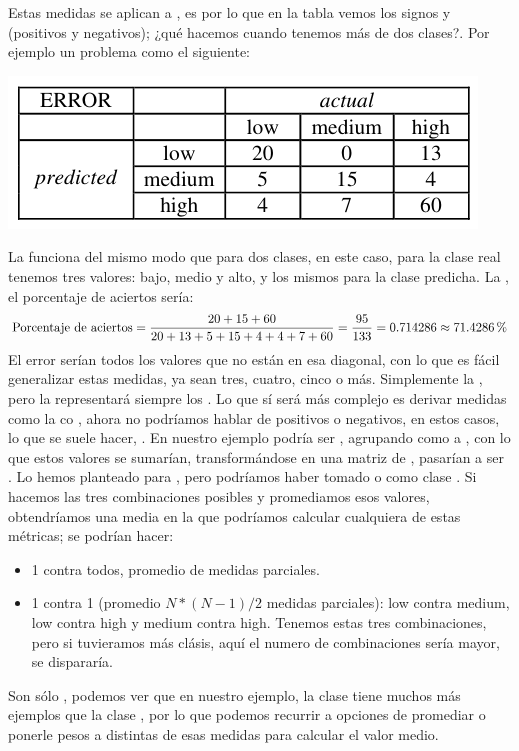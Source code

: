 Estas medidas se aplican a , es por lo que en la tabla vemos los signos \ti{+} y \ti{-} (positivos y negativos); ¿qué hacemos cuando tenemos más de dos clases?. Por ejemplo un problema como el siguiente:
\begin{center}
    \includegraphics[scale=.75]{images/mod02-13.png}
\end{center}
La  funciona del mismo modo que para dos clases, en este caso, para la clase real tenemos tres valores: bajo, medio y alto, y los mismos para la clase predicha. La , el porcentaje de aciertos sería:
\[
\text{Porcentaje de aciertos} = \frac{20+15+60}{20+13+5+15+4+4+7+60} = \frac{95}{133} =   0.714286 \approx 71.4286\,\%
\]
El error serían todos los valores que no están en esa diagonal, con lo que es fácil generalizar estas medidas, ya sean tres, cuatro, cinco o más. Simplemente la , pero la  representará siempre los . Lo que sí será más complejo es derivar medidas como la  co , ahora no podríamos hablar de positivos o negativos, en estos casos, lo que se suele hacer, . En nuestro ejemplo podría ser , agrupando como  a , con lo que estos valores se sumarían, transformándose en una matriz de ,  pasarían a ser . Lo hemos planteado para , pero podríamos haber tomado  o  como clase . Si hacemos las tres combinaciones posibles y promediamos esos valores, obtendríamos una media en la que podríamos calcular cualquiera de estas métricas; se podrían hacer:
\begin{itemize}
    \item 1 contra todos, promedio de  medidas parciales.
    \item 1 contra 1 (promedio  $N\ast(N-1)/2$ medidas parciales): low contra medium, low contra high y medium contra high. Tenemos estas tres combinaciones, pero si tuvieramos más clásis, aquí el numero de combinaciones sería mayor, se dispararía.
\end{itemize}
Son sólo , podemos ver que en nuestro ejemplo, la clase  tiene muchos más ejemplos que la clase , por lo que podemos recurrir a opciones de promediar o ponerle pesos a distintas de esas medidas para calcular el valor medio.

